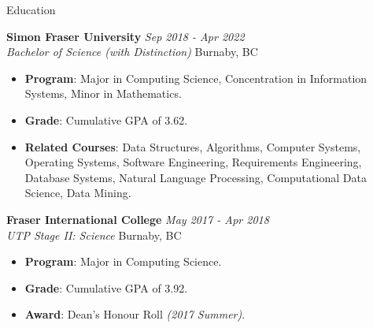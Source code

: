 \documentclass{resume} %
\begin{document}

\begin{rSection}{Education}

{\bf Simon Fraser University} \hfill {\em Sep 2018 - Apr 2022} 
\\{ \textit {Bachelor of Science (with Distinction)}} \hfill {Burnaby, BC} 
\begin{itemize}
  \vspace{-0.2cm}\item \textbf{Program}: Major in Computing Science, Concentration in Information Systems, Minor in Mathematics.
  \vspace{-0.2cm}\item \textbf{Grade}: Cumulative GPA of 3.62.
  \vspace{-0.2cm}\item \textbf{Related Courses}: Data Structures, Algorithms, Computer Systems, Operating Systems, Software Engineering, Requirements Engineering, Database Systems, Natural Language Processing, Computational Data Science, Data Mining.
\end{itemize}

{\bf Fraser International College} \hfill {\em May 2017 - Apr 2018} 
\\{ \textit {UTP Stage II:  Science}} \hfill {Burnaby, BC} 
\begin{itemize}
  \vspace{-0.2cm}\item \textbf{Program}: Major in Computing Science.
  \vspace{-0.2cm}\item \textbf{Grade}: Cumulative GPA of 3.92.
  \vspace{-0.2cm}\item \textbf{Award}: Dean’s Honour Roll \textit{(2017 Summer)}.
\end{itemize}


\end{rSection}
\end{document}

